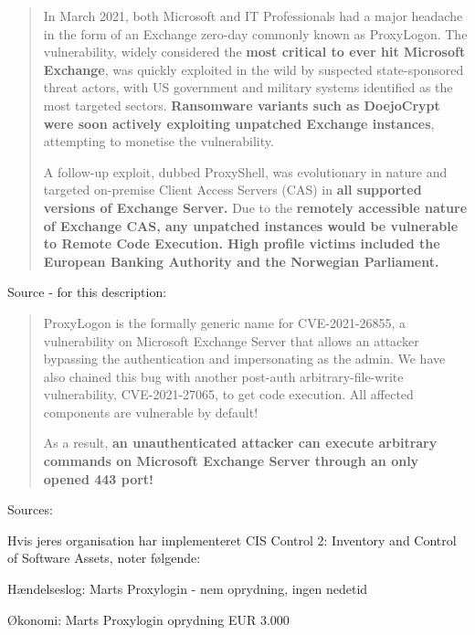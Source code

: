 \documentclass[Screen16to9,17pt]{foils}
\begin{document}
\begin{quote}
In March 2021, both Microsoft and IT Professionals had a major headache in the form of an Exchange zero-day commonly known as ProxyLogon. The vulnerability, widely considered the {\bf most critical to ever hit Microsoft Exchange}, was quickly exploited in the wild by suspected state-sponsored threat actors, with US government and military systems identified as the most targeted sectors. {\bf Ransomware variants such as DoejoCrypt were soon actively exploiting unpatched Exchange instances}, attempting to monetise the vulnerability.

A follow-up exploit, dubbed ProxyShell, was evolutionary in nature and targeted on-premise Client Access Servers (CAS) in {\bf all supported versions of Exchange Server.} Due to the {\bf remotely accessible nature of Exchange CAS, any unpatched instances would be vulnerable to Remote Code Execution. High profile victims included the European Banking Authority and the Norwegian Parliament.}
\end{quote}
Source - for this description:\\



\begin{quote}
ProxyLogon is the formally generic name for CVE-2021-26855, a vulnerability on Microsoft Exchange Server that allows an attacker bypassing the authentication and impersonating as the admin. We have also chained this bug with another post-auth arbitrary-file-write vulnerability, CVE-2021-27065, to get code execution. All affected components are vulnerable by default!

As a result, {\bf an unauthenticated attacker can execute arbitrary commands on Microsoft Exchange Server through an only opened 443 port!}
\end{quote}

Sources: \\




Hvis jeres organisation har implementeret CIS Control 2: Inventory and Control of Software Assets, noter følgende:
\begin{list2}
\item Hændelseslog: Marts Proxylogin - nem oprydning, ingen nedetid
\item Økonomi: Marts Proxylogin oprydning EUR 3.000
\end{list2}
\end{document}
